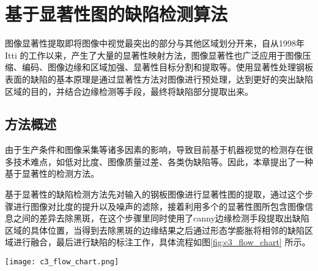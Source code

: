 ﻿%
%
%
%
%
%

\chapter{基于显著性图的缺陷检测算法}
图像显著性提取即将图像中视觉最突出的部分与其他区域划分开来，自从1998年Itti \cite{Itti1998A} 的工作以来，产生了大量的显著性映射方法\cite{Zhai2006Visual, Cheng2011Global, Achanta2008Salient, Achanta2009Frequency}，图像显著性也广泛应用于图像压缩、编码、图像边缘和区域加强、显著性目标分割和提取等。使用显著性处理钢板表面的缺陷的基本原理是通过显著性方法对图像进行预处理，达到更好的突出缺陷区域的目的，并结合边缘检测等手段，最终将缺陷部分提取出来。
    \section{方法概述}
    由于生产条件和图像采集等诸多因素的影响，导致目前基于机器视觉的检测存在很多技术难点，如低对比度、图像质量过差、各类伪缺陷等。因此，本章提出了一种基于显著性的检测方法。

    基于显著性的缺陷检测方法先对输入的钢板图像进行显著性图的提取，通过这个步骤进行图像对比度的提升以及噪声的滤除，接着利用多个的显著性图所包含图像信息之间的差异去除黑斑，在这个步骤里同时使用了canny边缘检测\cite{Canny1986A}手段提取出缺陷区域的具体位置，当得到去除黑斑的边缘结果之后通过形态学膨胀将相邻的缺陷区域进行融合，最后进行缺陷的标注工作，具体流程如图\ref{fig:c3_flow_chart} 所示。

    \begin{figure*}[!h]
    \centering
    \texttt{[image: c3\_flow\_chart.png]}
    \caption{基于显著性的缺陷检测算法流程图}
    \label{fig:c3_flow_chart}
    \end{figure*}

